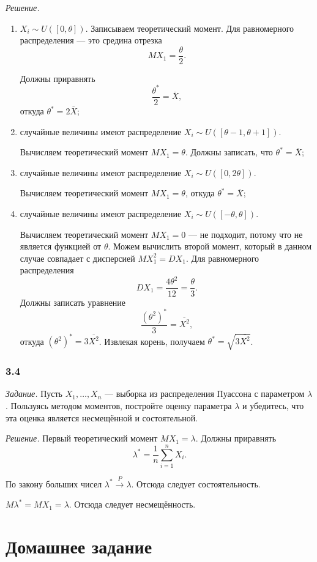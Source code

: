 \textit{Решение.}
\begin{enumerate}[label=\alph*)]
  \item $X_i \sim U \left( \left[ 0, \theta \right] \right) $.
  Записываем теоретический момент.
  Для равномерного распределения --- это средина отрезка
  $$MX_1 =
    \frac{ \theta }{2}.$$

  Должны приравнять
  $$ \frac{ \theta^*}{2} =
    \overline{X},$$
  откуда $ \theta^* = 2 \overline{X} $;
  \item случайные величины имеют распределение
  $X_i \sim
    U \left( \left[ \theta - 1, \theta + 1 \right] \right) $.

  Вычисляем теоретический момент $MX_1 = \theta $.
  Должны записать, что $ \theta^* = \overline{X}$;
  \item случайные величины имеют распределение
  $X_i \sim
    U \left( \left[ 0, 2 \theta \right] \right) $.

  Вычисляем теоретический момент $MX_1 = \theta $, откуда $ \theta^* = \overline{X}$;
  \item случайные величины имеют распределение
  $X_i \sim
    U \left( \left[ - \theta, \theta \right] \right) $.

  Вычисляем теоретический момент $MX_1 = 0$ --- не подходит,
  потому что не является функцией от $ \theta $.
  Можем вычислить второй момент, который в данном случае совпадает с дисперсией $MX_1^2 = DX_1$.
  Для равномерного распределения
  $$DX_1 =
    \frac{4 \theta^2}{12} =
    \frac{ \theta }{3}.$$
  Должны записать уравнение
  $$ \frac{ \left( \theta^2 \right)^*}{3} =
    \overline{X^2},$$
  откуда $ \left( \theta^2 \right)^* = 3 \overline{X^2}$.
  Извлекая корень, получаем $ \theta^* = \sqrt{3 \overline{X^2}}$.
\end{enumerate}

\subsubsection*{3.4}

\textit{Задание.}
Пусть $X_1, \dotsc, X_n$ --- выборка из распределения Пуассона с параметром $ \lambda $.
Пользуясь методом моментов, постройте оценку параметра $ \lambda $ и убедитесь,
что эта оценка является несмещённой и состоятельной.

\textit{Решение.} Первый теоретический момент $MX_1 = \lambda $.
Должны приравнять
$$ \lambda^* =
  \frac{1}{n} \sum \limits_{i = 1}^n X_i.$$

По закону больших чисел $ \lambda^* \overset{P}{ \to } \lambda $.
Отсюда следует состоятельность.

$M \lambda^* = MX_1 = \lambda $.
Отсюда следует несмещённость.

\section*{Домашнее задание}
